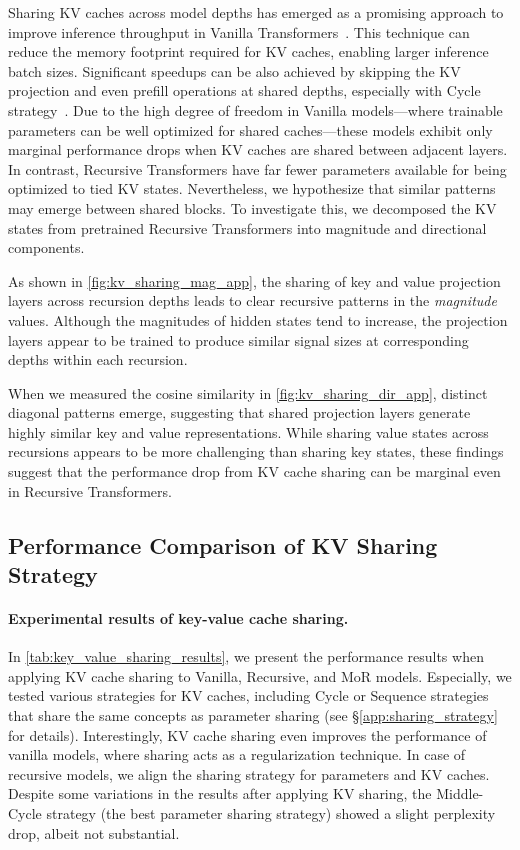 Sharing KV caches across model depths has emerged as a promising approach to improve inference throughput in Vanilla Transformers~\citep{brandon2024reducing}. This technique can reduce the memory footprint required for KV caches, enabling larger inference batch sizes. Significant speedups can be also achieved by skipping the KV projection and even prefill operations at shared depths, especially with Cycle strategy~\citep{sun2024you}. Due to the high degree of freedom in Vanilla models—where trainable parameters can be well optimized for shared caches—these models exhibit only marginal performance drops when KV caches are shared between adjacent layers.
In contrast, Recursive Transformers have far fewer parameters available for being optimized to tied KV states. Nevertheless, we hypothesize that similar patterns may emerge between shared blocks. To investigate this, we decomposed the KV states from pretrained Recursive Transformers into magnitude and directional components.


As shown in \autoref{fig:kv_sharing_mag_app}, the sharing of key and value projection layers across recursion depths leads to clear recursive patterns in the \textit{magnitude} values. Although the magnitudes of hidden states tend to increase, the projection layers appear to be trained to produce similar signal sizes at corresponding depths within each recursion.




When we measured the cosine similarity in \autoref{fig:kv_sharing_dir_app}, distinct diagonal patterns emerge, suggesting that shared projection layers generate highly similar key and value representations. While sharing value states across recursions appears to be more challenging than sharing key states, these findings suggest that the performance drop from KV cache sharing can be marginal even in Recursive Transformers.





\subsection{Performance Comparison of KV Sharing Strategy}


\paragraph{Experimental results of key-value cache sharing.}
In \autoref{tab:key_value_sharing_results}, we present the performance results when applying KV cache sharing to Vanilla, Recursive, and MoR models. Especially, we tested various strategies for KV caches, including Cycle or Sequence strategies that share the same concepts as parameter sharing (see \S\ref{app:sharing_strategy} for details). Interestingly, KV cache sharing even improves the performance of vanilla models, where sharing acts as a regularization technique.
In case of recursive models, we align the sharing strategy for parameters and KV caches. Despite some variations in the results after applying KV sharing, the Middle-Cycle strategy (the best parameter sharing strategy) showed a slight perplexity drop, albeit not substantial.


